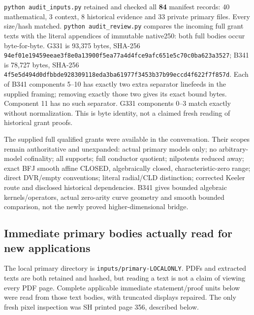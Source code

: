 \documentclass[
]{article}
\begin{document}
\texttt{python\ audit\_inputs.py} retained and checked all \textbf{84}
manifest records: 40 mathematical, 3 context, 8 historical evidence and
33 private primary files. Every size/hash matched.
\texttt{python\ audit\_review.py} compares the incoming full grant texts
with the literal appendices of immutable native250: both full bodies
occur byte-for-byte. G331 is 93,375 bytes, SHA-256
\texttt{94ef01e19459eeae3f8e0a13900f5ea77a4d4fce9afc651e5c70c0ba623a3527};
B341 is 78,727 bytes, SHA-256
\texttt{4f5e5d494d0dfbbde928309118eda3ba61977f3453b37b99eccd4f622f7f857d}.
Each of B341 components 5--10 has exactly two extra separator linefeeds
in the supplied framing; removing exactly those two gives its exact
bound bytes. Component 11 has no such separator. G331 components 0--3
match exactly without normalization. This is byte identity, not a
claimed fresh reading of historical grant proofs.

The supplied full qualified grants were available in the conversation.
Their scopes remain authoritative and unexpanded: actual primary models
only; no arbitrary-model cofinality; all supports; full conductor
quotient; nilpotents reduced away; exact BFJ smooth affine CLOSED,
algebraically closed, characteristic-zero range; direct DVR/empty
conventions; literal radial/CLD distinction; corrected Keeler route and
disclosed historical dependencies. B341 gives bounded algebraic
kernels/operators, actual zero-arity curve geometry and smooth bounded
comparison, not the newly proved higher-dimensional bridge.

\subsection{Immediate primary bodies actually read for new
applications}\label{immediate-primary-bodies-actually-read-for-new-applications}

The local primary directory is \texttt{inputs/primary-LOCALONLY}. PDFs
and extracted texts are both retained and hashed, but reading a text is
not a claim of viewing every PDF page. Complete applicable immediate
statement/proof units below were read from those text bodies, with
truncated displays repaired. The only fresh pixel inspection was SH
printed page 356, described below.
\end{document}
